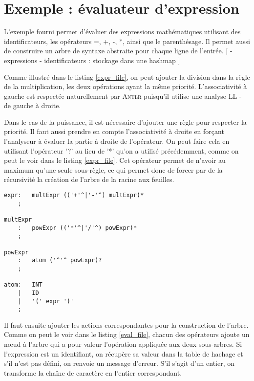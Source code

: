 \documentclass[paper=a4, fontsize=11pt]{scrartcl} %
\numberwithin{equation}{section} %
\numberwithin{figure}{section} %
\numberwithin{table}{section} %
\begin{document}

\section{Exemple : évaluateur d'expression}

L'exemple fourni permet d'évaluer des expressions mathématiques utilisant des identificateurs, les opérateurs =, +, -, *, ainsi que le parenthésage. Il permet aussi de construire un arbre de syntaxe abstraite pour chaque ligne de l'entrée.
[
- expressions
- identificateurs : stockage dans une hashmap
]


Comme illustré dans le listing \ref{expr_file}, on peut ajouter la division dans la règle de la multiplication, les deux opérations ayant la même priorité. L'associativité à gauche est respectée naturellement par \textsc{Antlr} puisqu'il utilise une analyse LL - de gauche à droite.

Dans le cas de la puissance, il est nécessaire d'ajouter une règle pour
respecter la priorité. Il faut aussi prendre en compte l'associativité à droite
en forçant l'analyseur à évaluer la partie à droite de l'opérateur. On peut
faire cela en utilisant l'opérateur '?' au lieu de '*' qu'on a utilisé
précédemment, comme on peut le voir dans le listing \ref{expr_file}. Cet
opérateur permet de n'avoir au maximum qu'une seule sous-règle, ce qui permet
donc de forcer par de la récursivité la création de l'arbre de la racine aux
feuilles.

    
\begin{lstlisting}[label=expr_file,caption=Fichier Expr.g,
linebackgroundcolor={\lstcolorlines[red!30]{8,9,10}\lstcolorlines[green!30]{5}}]
expr:   multExpr (('+'^|'-'^) multExpr)*
    ;

multExpr
    :   powExpr (('*'^|'/'^) powExpr)*
    ;

powExpr
    :   atom ('^'^ powExpr)?
    ;

atom:   INT
    |   ID
    |   '(' expr ')'
    ;
\end{lstlisting}

Il faut ensuite ajouter les actions correspondantes pour la construction de l'arbre. Comme on peut le voir dans le listing \ref{eval_file}, chacun des opérateurs ajoute un nœud à l'arbre qui a pour valeur l'opération appliquée aux deux sous-arbres. Si l'expression est un identifiant, on récupère sa valeur dans la table de hachage et s'il n'est pas défini, on renvoie un message d'erreur. S'il s'agit d'un entier, on transforme la chaîne de caractère en l'entier correspondant. 
\end{document}
